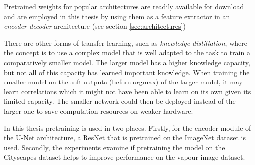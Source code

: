 Pretrained weights for popular architectures are readily available for download and are employed in this thesis by using them as a feature extractor in an \emph{encoder-decoder} architecture (see section \ref{sec:architectures})

There are other forms of transfer learning, such as \emph{knowledge distillation}, where the concept is to use a complex model that is well adapted to the task to train a comparatively smaller model. The larger model has a higher knowledge capacity, but not all of this capacity has learned important knowledge. When training the smaller model on the soft outputs (before argmax) of the larger model, it may learn correlations which it might not have been able to learn on its own given its limited capacity. The smaller network could then be deployed instead of the larger one to save computation resources on weaker hardware.

In this thesis pretraining is used in two places. Firstly, for the encoder module of the U-Net architecture, a ResNet that is pretrained on the ImageNet dataset is used. Secondly, the experiments examine if pretraining the model on the Cityscapes dataset helps to improve performance on the vapour image dataset.